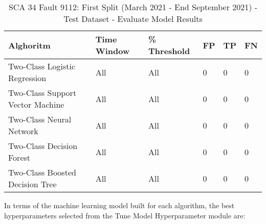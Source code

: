 \begin{table}[!ht]
    \centering
    \begin{tabular}{|l|l|l|l|l|l|}
    \hline
        Alghoritm & Time Window & \% Threshold & FP & TP & FN \\ \hline
        Two-Class Logistic Regression & All & All & 0 & 0 & 0 \\ \hline
        Two-Class Support Vector Machine & All & All & 0 & 0 & 0 \\ \hline
        Two-Class Neural Network & All & All & 0 & 0 & 0 \\ \hline
        Two-Class Decision Forest & All & All & 0 & 0 & 0 \\ \hline
        Two-Class Boosted Decision Tree & All & All & 0 & 0 & 0 \\ \hline
    \end{tabular}
    \caption{SCA 34 Fault 9112: First Split (March 2021 - End September 2021) - Test Dataset - Evaluate Model Results}
    \label{9112_SCA34_1st}
\end{table}

In terms of the machine learning model built for each algorithm, the best hyperparameters selected from the Tune Model Hyperparameter module are:

